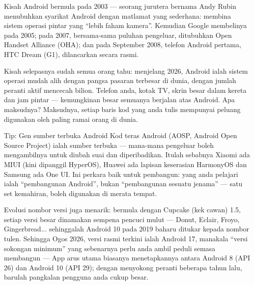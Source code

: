 


Kisah Android bermula pada 2003 — seorang jurutera bernama Andy Rubin menubuhkan syarikat Android dengan matlamat yang sederhana: membina sistem operasi pintar yang “lebih faham kamera”. Kemudian Google membelinya pada 2005; pada 2007, bersama-sama puluhan pengeluar, ditubuhkan Open Handset Alliance (OHA); dan pada September 2008, telefon Android pertama, HTC Dream (G1), dilancarkan secara rasmi.

Kisah selepasnya sudah semua orang tahu: menjelang 2026, Android ialah sistem operasi mudah alih dengan pangsa pasaran terbesar di dunia, dengan jumlah peranti aktif mencecah bilion. Telefon anda, kotak TV, skrin besar dalam kereta dan jam pintar — kemungkinan besar semuanya berjalan atas Android. Apa maksudnya? Maksudnya, setiap baris kod yang anda tulis mempunyai peluang digunakan oleh paling ramai orang di dunia.

\begin{tcbinfo}{Tip: Gen sumber terbuka Android}
Kod teras Android (AOSP, Android Open Source Project) ialah sumber terbuka — mana-mana pengeluar boleh mengambilnya untuk diubah suai dan diperibadikan. Itulah sebabnya Xiaomi ada MIUI (kini dipanggil HyperOS), Huawei ada lapisan keserasian HarmonyOS dan Samsung ada One UI. Ini perkara baik untuk pembangun: yang anda pelajari ialah “pembangunan Android”, bukan “pembangunan sesuatu jenama” — satu set kemahiran, boleh digunakan di merata tempat.

\end{tcbinfo}

Evolusi nombor versi juga menarik: bermula dengan Cupcake (kek cawan) 1.5, setiap versi besar dinamakan sempena pencuci mulut — Donut, Eclair, Froyo, Gingerbread... sehinggalah Android 10 pada 2019 baharu ditukar kepada nombor tulen. Sehingga Ogos 2026, versi rasmi terkini ialah Android 17, manakala “versi sokongan minimum” yang sebenarnya perlu anda ambil peduli semasa membangun — App arus utama biasanya menetapkannya antara Android 8 (API 26) dan Android 10 (API 29); dengan menyokong peranti beberapa tahun lalu, barulah pangkalan pengguna anda cukup besar.

